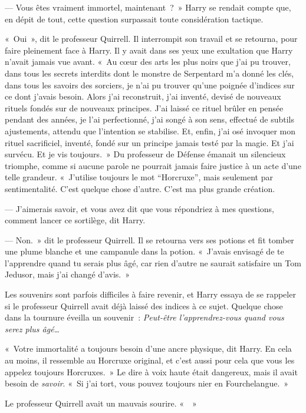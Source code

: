--- Vous êtes vraiment immortel, maintenant~?~» Harry se rendait compte que, en dépit de tout, cette question surpassait toute considération tactique.

«~Oui~», dit le professeur Quirrell. Il interrompit son travail et se retourna, pour faire pleinement face à Harry. Il y avait dans ses yeux une exultation que Harry n'avait jamais vue avant. «~Au cœur des arts les plus noirs que j'ai pu trouver, dans tous les secrets interdits dont le monstre de Serpentard m'a donné les clés, dans tous les savoirs des sorciers, je n'ai pu trouver qu'une poignée d'indices sur ce dont j'avais besoin. Alors j'ai reconstruit, j'ai inventé, devisé de nouveaux rituels fondés sur de nouveaux principes. J'ai laissé ce rituel brûler en pensée pendant des années, je l'ai perfectionné, j'ai songé à son sens, effectué de subtils ajustements, attendu que l'intention se stabilise. Et, enfin, j'ai osé invoquer mon rituel sacrificiel, inventé, fondé sur un principe jamais testé par la magie. Et j'ai survécu. Et je vis toujours.~» Du professeur de Défense émanait un silencieux triomphe, comme si aucune parole ne pourrait jamais faire justice à un acte d'une telle grandeur. «~J'utilise toujours le mot “Horcruxe”, mais seulement par sentimentalité. C'est quelque chose d'autre. C'est ma plus grande création.

--- J'aimerais savoir, et vous avez dit que vous répondriez à mes questions, comment lancer ce sortilège, dit Harry.

--- Non.~» dit le professeur Quirrell. Il se retourna vers ses potions et fit tomber une plume blanche et une campanule dans la potion. «~J'avais envisagé de te l'apprendre quand tu serais plus âgé, car rien d'autre ne saurait satisfaire un Tom Jedusor, mais j'ai changé d'avis.~»

Les souvenirs sont parfois difficiles à faire revenir, et Harry essaya de se rappeler si le professeur Quirrell avait déjà laissé des indices à ce sujet. Quelque chose dans la tournure éveilla un souvenir~: \emph{Peut-être l'apprendrez-vous quand vous serez plus âgé…}

«~Votre immortalité a toujours besoin d'une ancre physique, dit Harry. En cela au moins, il ressemble au Horcruxe original, et c'est aussi pour cela que vous les appelez toujours Horcruxes.~» Le dire à voix haute était dangereux, mais il avait besoin de \emph{savoir}. «~Si j'ai tort, vous pouvez toujours nier en Fourchelangue.~»

Le professeur Quirrell avait un mauvais sourire. «~~»

